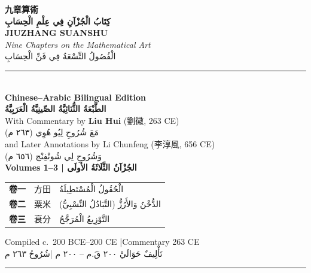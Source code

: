 \documentclass[11pt,a4paper]{article}
\newcommand{\ar}[1]{\arabicfont\beginR #1\endR}
\newenvironment{prob bilingual}{%
  \begin{paracol}{2}%
  \switchcolumn[0]*%
}{%
  \end{paracol}%
  \vspace{0.3em}%
}
\begin{document}
\begin{titlepage}
\begin{center}
\vspace*{2cm}

{\Huge\bfseries\color{titlecolor} 九章算術}\\[0.5cm]
{\Huge\bfseries\color{titlecolor}\ar{كِتَابُ الْجُزْآنِ فِي عِلْمِ الْحِسَابِ}}\\[1cm]
{\LARGE\bfseries\color{sectioncolor} JIUZHANG SUANSHU}\\[0.3cm]
{\Large\textit{Nine Chapters on the Mathematical Art}}\\[0.3cm]
{\Large\ar{الْفُصُولُ التِّسْعَةُ فِي فَنِّ الْحِسَابِ}}\\[2cm]

\rule{0.7\textwidth}{0.8pt}\\[1.5cm]

{\Large\bfseries Chinese--Arabic Bilingual Edition}\\[0.3cm]
{\Large\bfseries\ar{الطَّبْعَةُ الثُّنَائِيَّةُ الصِّينِيَّةُ الْعَرَبِيَّةُ}}\\[1.5cm]

{\large With Commentary by \textbf{Liu Hui} (劉徽, 263 CE)}\\[0.3cm]
{\large\ar{مَعَ شُرُوحِ لِيُو هُوِي (٢٦٣ م)}}\\[0.5cm]
{\large and Later Annotations by Li Chunfeng (李淳風, 656 CE)}\\[0.3cm]
{\large\ar{وَشُرُوحِ لِي شُونْفِنْج (٦٥٦ م)}}\\[2cm]

{\Large\bfseries Volumes 1--3 | الجُزْآنُ الثَّلَاثَةُ الأولَى}\\[1cm]

\begin{tabular}{cll}
\textbf{卷一} & 方田 & \ar{الْحُقُولُ الْمُسْتَطِيلَةُ}\\[0.3cm]
\textbf{卷二} & 粟米 & \ar{الدُّخْنُ وَالأَرُزُّ (التَّبَادُلُ النِّسْبِيُّ)}\\[0.3cm]
\textbf{卷三} & 衰分 & \ar{التَّوْزِيعُ الْمُرَجَّحُ}\\
\end{tabular}

\vfill

{\small Compiled c.~200 BCE--200 CE \quad|\quad Commentary 263 CE}\\[0.3cm]
{\small\ar{تَأْلِيفٌ حَوَالَيْ ٢٠٠ قَ.م -- ٢٠٠ م \quad|\quad شُرُوحُ ٢٦٣ م}}\\[1cm]

\rule{0.4\textwidth}{0.4pt}

\end{center}
\end{titlepage}
\end{document}
